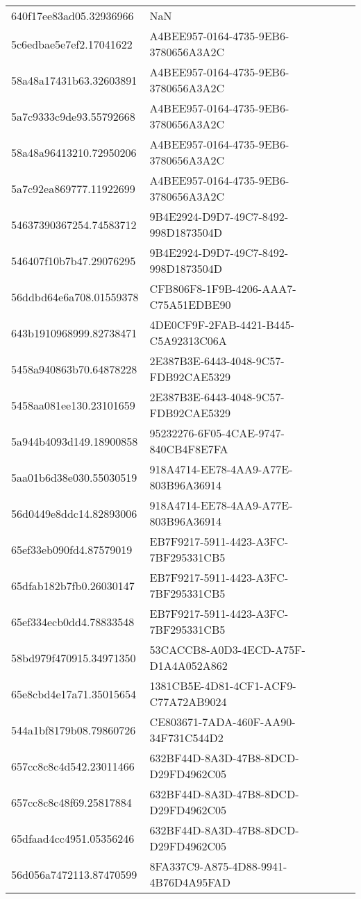 \begin{tabular}{ll}
640f17ee83ad05.32936966 & NaN \\
5c6edbae5e7ef2.17041622 & A4BEE957-0164-4735-9EB6-3780656A3A2C \\
58a48a17431b63.32603891 & A4BEE957-0164-4735-9EB6-3780656A3A2C \\
5a7c9333c9de93.55792668 & A4BEE957-0164-4735-9EB6-3780656A3A2C \\
58a48a96413210.72950206 & A4BEE957-0164-4735-9EB6-3780656A3A2C \\
5a7c92ea869777.11922699 & A4BEE957-0164-4735-9EB6-3780656A3A2C \\
54637390367254.74583712 & 9B4E2924-D9D7-49C7-8492-998D1873504D \\
546407f10b7b47.29076295 & 9B4E2924-D9D7-49C7-8492-998D1873504D \\
56ddbd64e6a708.01559378 & CFB806F8-1F9B-4206-AAA7-C75A51EDBE90 \\
643b1910968999.82738471 & 4DE0CF9F-2FAB-4421-B445-C5A92313C06A \\
5458a940863b70.64878228 & 2E387B3E-6443-4048-9C57-FDB92CAE5329 \\
5458aa081ee130.23101659 & 2E387B3E-6443-4048-9C57-FDB92CAE5329 \\
5a944b4093d149.18900858 & 95232276-6F05-4CAE-9747-840CB4F8E7FA \\
5aa01b6d38e030.55030519 & 918A4714-EE78-4AA9-A77E-803B96A36914 \\
56d0449e8ddc14.82893006 & 918A4714-EE78-4AA9-A77E-803B96A36914 \\
65ef33eb090fd4.87579019 & EB7F9217-5911-4423-A3FC-7BF295331CB5 \\
65dfab182b7fb0.26030147 & EB7F9217-5911-4423-A3FC-7BF295331CB5 \\
65ef334ecb0dd4.78833548 & EB7F9217-5911-4423-A3FC-7BF295331CB5 \\
58bd979f470915.34971350 & 53CACCB8-A0D3-4ECD-A75F-D1A4A052A862 \\
65e8cbd4e17a71.35015654 & 1381CB5E-4D81-4CF1-ACF9-C77A72AB9024 \\
544a1bf8179b08.79860726 & CE803671-7ADA-460F-AA90-34F731C544D2 \\
657cc8c8c4d542.23011466 & 632BF44D-8A3D-47B8-8DCD-D29FD4962C05 \\
657cc8c8c48f69.25817884 & 632BF44D-8A3D-47B8-8DCD-D29FD4962C05 \\
65dfaad4cc4951.05356246 & 632BF44D-8A3D-47B8-8DCD-D29FD4962C05 \\
56d056a7472113.87470599 & 8FA337C9-A875-4D88-9941-4B76D4A95FAD \\

\end{tabular}
